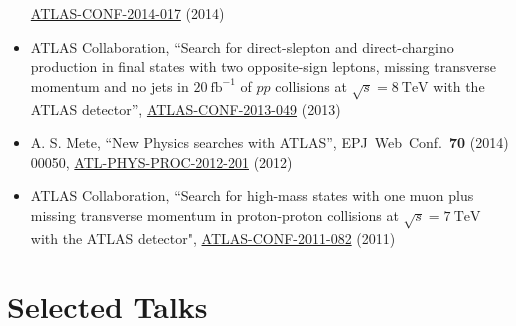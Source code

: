 \documentclass[a4paper,10pt]{article}
\begin{document}
\begin{itemize}
	\href{https://atlas.web.cern.ch/Atlas/GROUPS/PHYSICS/CONFNOTES/ATLAS-CONF-2014-017/}{ATLAS-CONF-2014-017} (2014) 
	\item ATLAS Collaboration, 
	``Search for direct-slepton and direct-chargino production in final states with two opposite-sign leptons, missing transverse momentum 
	and no jets in $20\ \mathrm{fb}^{-1}$ of $pp$ collisions at $\sqrt{s} = 8\ \mathrm{TeV}$ with the ATLAS detector'', 
	\href{https://atlas.web.cern.ch/Atlas/GROUPS/PHYSICS/CONFNOTES/ATLAS-CONF-2013-049/}{ATLAS-CONF-2013-049} (2013) 
	\item A. S. Mete, 
	``New Physics searches with ATLAS'', 
	EPJ\ Web\ Conf.\ {\bf 70} (2014) 00050, 
	\href{https://cds.cern.ch/record/1478973}{ATL-PHYS-PROC-2012-201} (2012)
	\item ATLAS Collaboration, 
	``Search for high-mass states with one muon plus missing transverse momentum in proton-proton collisions at $\sqrt{s} = 7\ \mathrm{TeV}$ with the ATLAS detector", 
	\href{https://atlas.web.cern.ch/Atlas/GROUPS/PHYSICS/CONFNOTES/ATLAS-CONF-2011-082/}{ATLAS-CONF-2011-082} (2011)
\end{itemize}

\clearpage

\section{Selected Talks}

\vspace{1mm}
\end{document}
